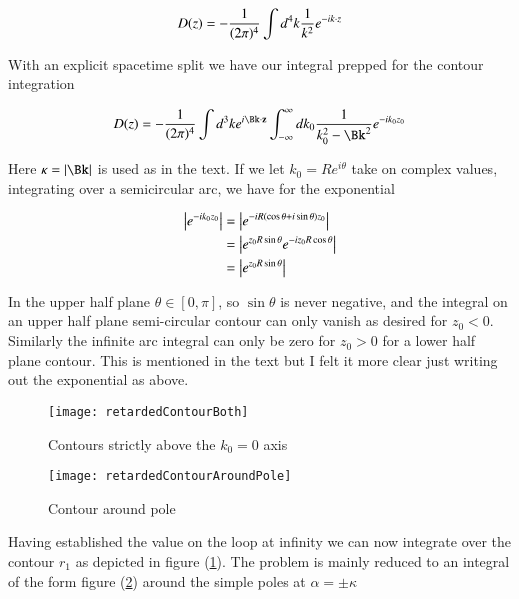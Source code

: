 \begin{align}\label{eqn:jacksonRet:boo8}
D(z) = -\frac{1}{(2\pi)^4} \int d^4 k \frac{1}{k^2} e^{-i k \cdot z} 
\end{align}

With an explicit spacetime split we have our integral prepped for the contour integration

\begin{align}\label{eqn:jacksonRet:boo9}
D(z) = -\inv{(2\pi)^4} \int d^3 k e^{i \Bk \cdot \Bz} \int_{-\infty}^\infty dk_0 \inv{k_0^2 - \Bk^2} e^{-i k_0 z_0} 
\end{align}

Here $\kappa = \Abs{\Bk}$ is used as in the text.  If we let $k_0 = R e^{i\theta}$ take on complex values, integrating over a semicircular arc, we have for the exponential 

\begin{align*}
\left\lvert{e^{-i k_0 z_0}}\right\rvert
&= \left\lvert{e^{-i R (\cos\theta + i \sin\theta) z_0} }\right\rvert \\
&= \left\lvert{e^{ z_0 R \sin\theta} e^{ -i z_0 R \cos\theta } }\right\rvert \\
&= \left\lvert{e^{ z_0 R \sin\theta} }\right\rvert
\end{align*}

In the upper half plane $\theta \in [0,\pi]$, so $\sin\theta$ is never negative, and the integral on an upper half plane semi-circular contour can only vanish as desired for $z_0 < 0$.  Similarly the infinite arc integral can only be zero for $z_0 > 0$ for a lower half plane contour.  This is mentioned in the text but I felt it more clear just writing out the exponential as above.

\begin{figure}[htp]
\centering
\texttt{[image: retardedContourBoth]}
\caption{Contours strictly above the $k_0 = 0$ axis}\label{fig:jacksonRet:retardedContourBoth}
\end{figure}

\begin{figure}[htp]
\centering
\texttt{[image: retardedContourAroundPole]}
\caption{Contour around pole}\label{fig:jacksonRet:retardedContourAroundPole}
\end{figure}

Having established the value on the loop at infinity we can now integrate over the contour $r_1$ as depicted in figure (\ref{fig:jacksonRet:retardedContourBoth}).  The problem is mainly reduced to an integral of the form figure (\ref{fig:jacksonRet:retardedContourAroundPole}) around the simple poles at $\alpha = \pm \kappa$

